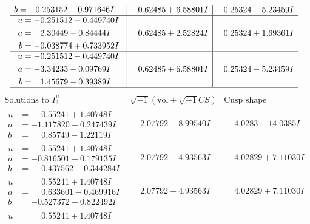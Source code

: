 \documentclass[1p]{elsarticle_modified}
\theoremstyle{definition}
\newcommand{\I}{\sqrt{-1}}
\begin{document}
$$\begin{array}{c|c|c}
\begin{aligned}
b &= -0.253152 - 0.971646 I\end{aligned}
 & \phantom{-}0.62485 + 6.58801 I & \phantom{-}0.25324 - 5.23459 I \\ \hline\begin{aligned}
u &= -0.251512 - 0.449740 I \\
a &= \phantom{-}2.30449 - 0.84444 I \\
b &= -0.038774 + 0.733952 I\end{aligned}
 & \phantom{-}0.62485 + 2.52824 I & \phantom{-}0.25324 + 1.69361 I \\ \hline\begin{aligned}
u &= -0.251512 - 0.449740 I \\
a &= -3.34233 - 0.09769 I \\
b &= \phantom{-}1.45679 - 0.39389 I\end{aligned}
 & \phantom{-}0.62485 + 6.58801 I & \phantom{-}0.25324 - 5.23459 I\\
 \hline 
 \end{array}$$\newpage$$\begin{array}{c|c|c}  
\text{Solutions to }I^u_{3}& \I (\text{vol} + \sqrt{-1}CS) & \text{Cusp shape}\\
 \hline 
\begin{aligned}
u &= \phantom{-}0.55241 + 1.40748 I \\
a &= -1.117820 + 0.247439 I \\
b &= \phantom{-}0.85749 - 1.22119 I\end{aligned}
 & \phantom{-}2.07792 - 8.99540 I & \phantom{-}4.0283 + 14.0385 I \\ \hline\begin{aligned}
u &= \phantom{-}0.55241 + 1.40748 I \\
a &= -0.816501 - 0.179135 I \\
b &= \phantom{-}0.437562 - 0.344284 I\end{aligned}
 & \phantom{-}2.07792 - 4.93563 I & \phantom{-}4.02829 + 7.11030 I \\ \hline\begin{aligned}
u &= \phantom{-}0.55241 + 1.40748 I \\
a &= \phantom{-}0.633601 - 0.469916 I \\
b &= -0.527372 + 0.822492 I\end{aligned}
 & \phantom{-}2.07792 - 4.93563 I & \phantom{-}4.02829 + 7.11030 I \\ \hline\begin{aligned}
u &= \phantom{-}0.55241 + 1.40748 I \\

\end{aligned}
\end{array}$$
\end{document}

